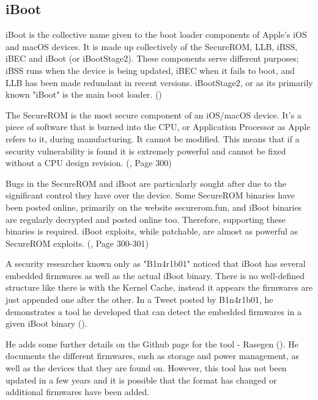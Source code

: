 \subsection{iBoot}


iBoot is the collective name given to the boot loader components of Apple's iOS and macOS devices. It is made up collectively of the SecureROM, LLB, iBSS, iBEC and iBoot (or iBootStage2). These components serve different purposes; iBSS runs when the device is being updated, iBEC when it fails to boot, and LLB has been made redundant in recent versions. iBootStage2, or as its primarily known "iBoot" is the main boot loader. (\cite{levin-os-internals-vol2-iboot})

The SecureROM is the most secure component of an iOS/macOS device. It's a piece of software that is burned into the CPU, or Application Processor as Apple refers to it, during manufacturing. It cannot be modified. This means that if a security vulnerability is found it is extremely powerful and cannot be fixed without a CPU design revision. (\cite{esser-hackers-handbook}, Page 300)

Bugs in the SecureROM and iBoot are particularly sought after due to the significant control they have over the device. Some SecureROM binaries have been posted online, primarily on the website securerom.fun, and iBoot binaries are regularly decrypted and posted online too. Therefore, supporting these binaries is required. iBoot exploits, while patchable, are almost as powerful as SecureROM exploits. (\cite{esser-hackers-handbook}, Page 300-301)



A security researcher known only as "B1n4r1b01" noticed that iBoot has several embedded firmwares as well as the actual iBoot binary. There is no well-defined structure like there is with the Kernel Cache, instead it appears the firmwares are just appended one after the other. In a Tweet posted by B1n4r1b01, he demonstrates a tool he developed that can detect the embedded firmwares in a given iBoot binary (\cite{binaryboy-iboot-tweet}).

He adds some further details on the Github page for the tool - Rasegen (\cite{rasegen-github}). He documents the different firmwares, such as storage and power management, as well as the devices that they are found on. However, this tool has not been updated in a few years and it is possible that the format has changed or additional firmwares have been added. 

